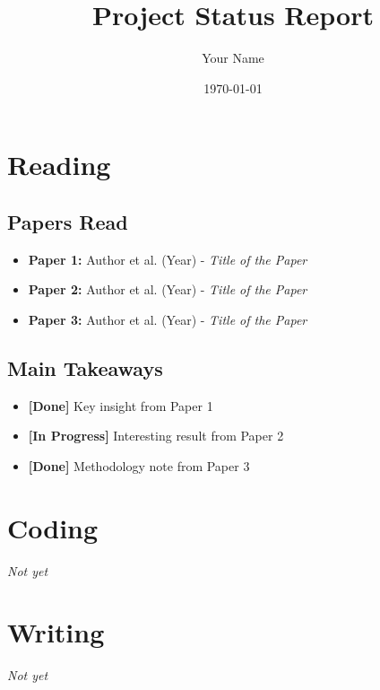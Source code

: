 \documentclass[a4paper,12pt]{article}
\title{\textbf{Project Status Report} \emoji{rocket}}
\author{Your Name}
\date{\today}
\begin{document}
\maketitle

\section*{Reading }
\subsection*{Papers Read}
\begin{itemize}
    \item \textbf{Paper 1:} Author et al. (Year) - \textit{Title of the Paper} 
    \item \textbf{Paper 2:} Author et al. (Year) - \textit{Title of the Paper} 
    \item \textbf{Paper 3:} Author et al. (Year) - \textit{Title of the Paper} 
\end{itemize}

\subsection*{Main Takeaways}
\begin{itemize}
    \item \textbf{[Done]} Key insight from Paper 1 
    \item \textbf{[In Progress]} Interesting result from Paper 2 
    \item \textbf{[Done]} Methodology note from Paper 3 
\end{itemize}

\section*{Coding }
\textit{Not yet}

\section*{Writing }
\textit{Not yet}
\end{document}
